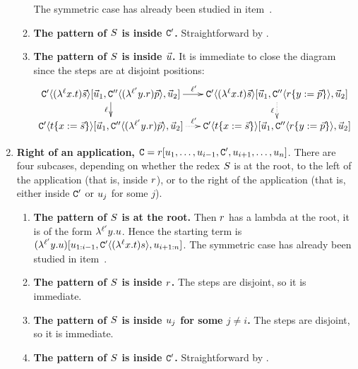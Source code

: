 \begin{enumerate}
\begin{enumerate}
      The symmetric case has already been studied in item~.
    \item {\bf The pattern of $S$ is inside $\mathtt{C}'$.} Straightforward by \ih.
    \item {\bf The pattern of $S$ is inside $\vec{u}$.}
      It is immediate to close the diagram since the steps are at disjoint positions:
        \[
        \xymatrix@C=.5cm@R=.5cm{
         \contwoof{(\lamp{\lab}{\var}{\tm}) \ls{\tmtwo}}
           [\ls{\tmthree}_1, \con''\of{(\lamp{\lab'}{\vartwo}{\tmfour}) \ls{\tmfive}}, \ls{\tmthree}_2]
                            \ar[d]_-{\lab}
                            \ar[r]^{\lab'} &
         \contwoof{(\lamp{\lab}{\var}{\tm})\ls{\tmtwo}}
             [\ls{\tmthree}_1, \con''\of{\subs{\tmfour}{\vartwo}{\ls{\tmfive}}}, \ls{\tmthree}_2]
                           \ar@{.>}[d]_-{\lab} \\
         \contwoof{\subs{\tm}{\var}{\ls{\tmtwo}}}
           [\ls{\tmthree}_1, \con''\of{(\lamp{\lab'}{\vartwo}{\tmfour}) \ls{\tmfive}}, \ls{\tmthree}_2]
                            \ar@{.>}[r]^{\lab'}
                           &
         \contwoof{\subs{\tm}{\var}{\ls{\tmtwo}}}
             [\ls{\tmthree}_1, \con''\of{\subs{\tmfour}{\vartwo}{\ls{\tmfive}}}, \ls{\tmthree}_2]
        }
        \]
    \end{enumerate}
\item {\bf Right of an application,
  $\mathtt{C} = r[u_1, \hdots, u_{i-1}, \mathtt{C}',u_{i+1}, \hdots, u_n]$}.
  There are four subcases, depending on whether the redex $S$ is
  at the root, to the left of the application (that is, inside $r$),
  or to the right of the application (that is, either inside $\mathtt{C}'$ or $u_j$ for some $j$).
  \begin{enumerate}
  \item {\bf The pattern of $S$ is at the root.}
    Then $r$ has a lambda at the root, \ie it is of the form $\lambda^{\ell'} y. u$.
    Hence the starting term is
    $
      (\lambda^{\ell'} y. u) [u_{1:i-1}, \mathtt{C}'\langle(\lambda^{\ell} x. t)s\rangle,u_{i+1:n}]
    $.
    The symmetric case has already been studied in item~.
  \item {\bf The pattern of $S$ is inside $r$.}
    The steps are disjoint, so it is immediate.
  \item {\bf The pattern of $S$ is inside $u_j$ for some $j \neq i$.}
    The steps are disjoint, so it is immediate.
  \item {\bf The pattern of $S$ is inside $\mathtt{C}'$.}
    Straightforward by \ih.
  \end{enumerate}
\end{enumerate}







